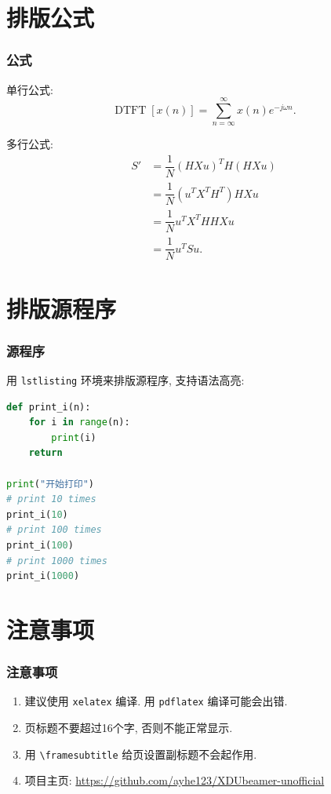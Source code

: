 \documentclass{ctexbeamer}
\begin{document}
\section{排版公式}
\begin{frame}
    \frametitle{公式}
    单行公式:
    \[\operatorname{DTFT}[x(n)]=\sum\limits_{n=\infty}^{\infty}x(n)e^{-j\omega n}.\]

    多行公式:
    \begin{align*}
        S' & =\dfrac{1}{N}(HXu)^TH(HXu) \\
        & =\dfrac{1}{N}(u^TX^TH^T)HXu \\
        & =\dfrac{1}{N}u^TX^THHXu \\
        & =\dfrac{1}{N}u^TSu.
    \end{align*}
\end{frame}
\section{排版源程序}
\begin{frame}[fragile]
    \frametitle{源程序}
    用 \verb|lstlisting| 环境来排版源程序, 支持语法高亮:

    \begin{lstlisting}[language=Python]
def print_i(n):
    for i in range(n):
        print(i)
    return

print("开始打印")
# print 10 times
print_i(10)
# print 100 times
print_i(100)
# print 1000 times
print_i(1000)
    \end{lstlisting}
    \end{frame}
\section{注意事项}
\begin{frame}[fragile]
    \frametitle{注意事项}
    \begin{enumerate}
        \item 建议使用 \verb|xelatex| 编译. 用 \verb|pdflatex| 编译可能会出错.
        \item 页标题不要超过16个字, 否则不能正常显示.
        \item 用 \verb|\framesubtitle| 给页设置副标题不会起作用.
        \item 项目主页: \url{https://github.com/ayhe123/XDUbeamer-unofficial}
    \end{enumerate}
\end{frame}
\end{document}
